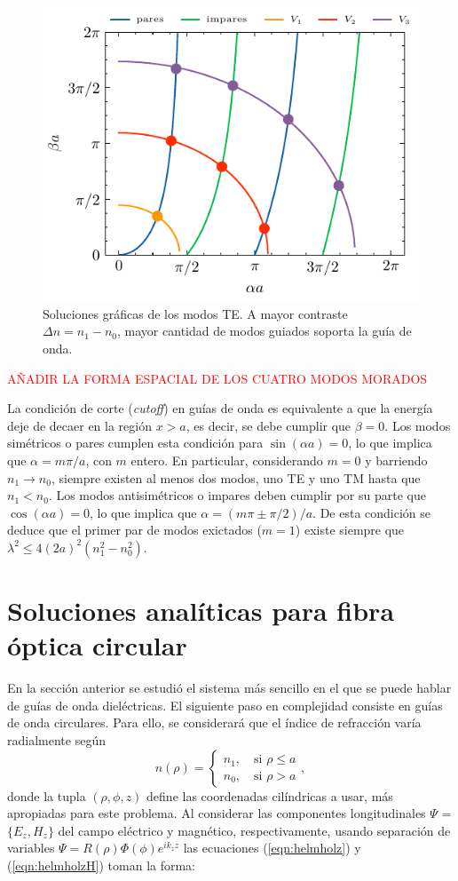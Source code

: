 \begin{figure}[H]
	\centering
	\includegraphics[width=0.7\linewidth]{media/slabgraphical}
	\caption[Soluciones gráficas de los modos TE]{Soluciones gráficas de los modos TE. A mayor contraste $\Delta n = n_1-n_0$, mayor cantidad de modos guiados soporta la guía de onda.}
\end{figure}

\textcolor{red}{AÑADIR LA FORMA ESPACIAL DE LOS CUATRO MODOS MORADOS}

La condición de corte (\textit{cutoff}) en guías de onda es equivalente a que la energía deje de decaer en la región $x > a$, es decir, se debe cumplir que $\beta = 0$. 
Los modos simétricos o pares cumplen esta condición para $\sin(\alpha a) = 0$, lo que implica que $\alpha = m \pi/a$, con $m$ entero. En particular, considerando $m=0$  y barriendo $n_1 \to n_0$, siempre existen al menos dos modos, uno TE y uno TM hasta que $n_1 < n_0$.  
Los modos antisimétricos o impares deben cumplir por su parte que $\cos(\alpha a) = 0$, lo que implica que $\alpha = (m\pi \pm \pi/2)/a$. De esta condición se deduce que el primer par de modos exictados ($m=1$) existe siempre que $\lambda^2 \le 4(2a)^2 (n_1^2-n_0^2) $.

\section{Soluciones analíticas para fibra óptica circular}
En la sección anterior se estudió el sistema más sencillo en el que se puede hablar de guías de onda dieléctricas. El siguiente paso en complejidad consiste en guías de onda circulares. Para ello, se considerará que el índice de refracción varía radialmente según 
\begin{equation}
	n( \rho ) = 
	\left\{\begin{matrix}
	n_1, \quad \text{si } \rho \le a
	\\
	n_0, \quad \text{si } \rho > a
	\end{matrix}\right.
	,\nonumber
\end{equation}
donde la tupla $(\rho, \phi, z)$ define las coordenadas cilíndricas a usar, más apropiadas para este problema. Al considerar las componentes longitudinales $\Psi$ = $\{E_z, H_z\}$ del campo eléctrico y magnético, respectivamente, usando separación de variables $\Psi =  R(\rho)\Phi(\phi) e^{ik_z z} $ las ecuaciones (\ref{eqn:helmholz}) y (\ref{eqn:helmholzH}) toman la forma:

